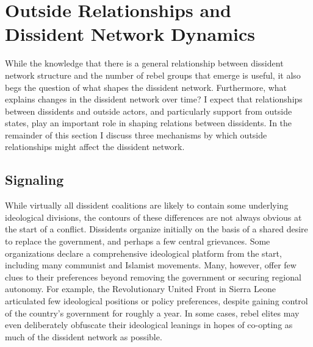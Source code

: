 
\section{Outside Relationships and Dissident Network Dynamics}

While the knowledge that there is a general relationship between dissident network structure and the number of rebel groups that emerge is useful, it also begs the question of what shapes the dissident network. Furthermore, what explains changes in the dissident network over time? I expect that relationships between dissidents and outside actors, and particularly support from outside states, play an important role in shaping relations between dissidents. In the remainder of this section I discuss three mechanisms by which outside relationships might affect the dissident network.

\subsection{Signaling}

While virtually all dissident coalitions are likely to contain some underlying ideological divisions, the contours of these differences are not always obvious at the start of a conflict. Dissidents organize initially on the basis of a shared desire to replace the government, and perhaps a few central grievances. Some organizations declare a  comprehensive ideological platform from the start, including many communist and Islamist movements. Many, however, offer few clues to their preferences beyond removing the government or securing regional autonomy. For example, the Revolutionary United Front in Sierra Leone articulated few ideological positions or policy preferences, despite gaining control of the country's government for roughly a year. In some cases, rebel elites may even deliberately obfuscate their ideological leanings in hopes of co-opting as much of the dissident network as possible.

